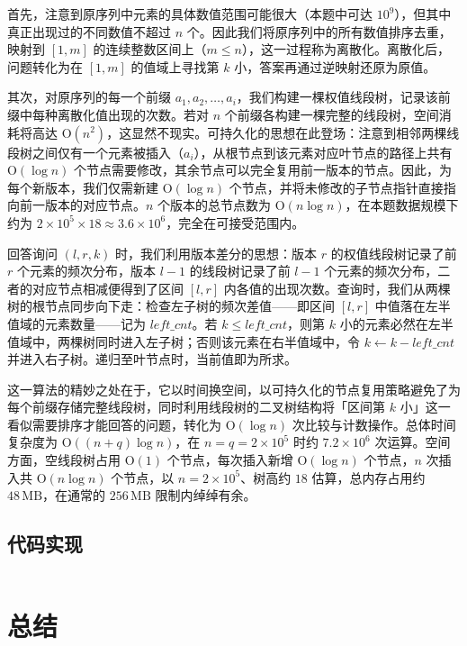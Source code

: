\documentclass[12pt, a4paper]{academics}
\begin{document}
首先，注意到原序列中元素的具体数值范围可能很大（本题中可达 $10^9$），但其中真正出现过的不同数值不超过 $n$ 个。因此我们将原序列中的所有数值排序去重，映射到 $[1, m]$ 的连续整数区间上（$m \le n$），这一过程称为离散化。离散化后，问题转化为在 $[1, m]$ 的值域上寻找第 $k$ 小，答案再通过逆映射还原为原值。

其次，对原序列的每一个前缀 $a_1, a_2, \dots, a_i$，我们构建一棵权值线段树，记录该前缀中每种离散化值出现的次数。若对 $n$ 个前缀各构建一棵完整的线段树，空间消耗将高达 $\mathrm{O}(n^2)$，这显然不现实。可持久化的思想在此登场：注意到相邻两棵线段树之间仅有一个元素被插入（$a_i$），从根节点到该元素对应叶节点的路径上共有 $\mathrm{O}(\log n)$ 个节点需要修改，其余节点可以完全复用前一版本的节点。因此，为每个新版本，我们仅需新建 $\mathrm{O}(\log n)$ 个节点，并将未修改的子节点指针直接指向前一版本的对应节点。$n$ 个版本的总节点数为 $\mathrm{O}(n \log n)$，在本题数据规模下约为 $2 \times 10^5 \times 18 \approx 3.6 \times 10^6$，完全在可接受范围内。

回答询问 $(l, r, k)$ 时，我们利用版本差分的思想：版本 $r$ 的权值线段树记录了前 $r$ 个元素的频次分布，版本 $l-1$ 的线段树记录了前 $l-1$ 个元素的频次分布，二者的对应节点相减便得到了区间 $[l, r]$ 内各值的出现次数。查询时，我们从两棵树的根节点同步向下走：检查左子树的频次差值——即区间 $[l, r]$ 中值落在左半值域的元素数量——记为 $\mathit{left\_cnt}$。若 $k \le \mathit{left\_cnt}$，则第 $k$ 小的元素必然在左半值域中，两棵树同时进入左子树；否则该元素在右半值域中，令 $k \gets k - \mathit{left\_cnt}$ 并进入右子树。递归至叶节点时，当前值即为所求。

这一算法的精妙之处在于，它以时间换空间，以可持久化的节点复用策略避免了为每个前缀存储完整线段树，同时利用线段树的二叉树结构将「区间第 $k$ 小」这一看似需要排序才能回答的问题，转化为 $\mathrm{O}(\log n)$ 次比较与计数操作。总体时间复杂度为 $\mathrm{O}((n + q) \log n)$，在 $n = q = 2 \times 10^5$ 时约 $7.2 \times 10^6$ 次运算。空间方面，空线段树占用 $\mathrm{O}(1)$ 个节点，每次插入新增 $\mathrm{O}(\log n)$ 个节点，$n$ 次插入共 $\mathrm{O}(n \log n)$ 个节点，以 $n = 2 \times 10^5$、树高约 $18$ 估算，总内存占用约 $48\,\mathrm{MB}$，在通常的 $256\,\mathrm{MB}$ 限制内绰绰有余。

\subsection{代码实现}

\inputminted{c++}{../src/p4_chairman.cpp}

\section{总结}
\end{document}

